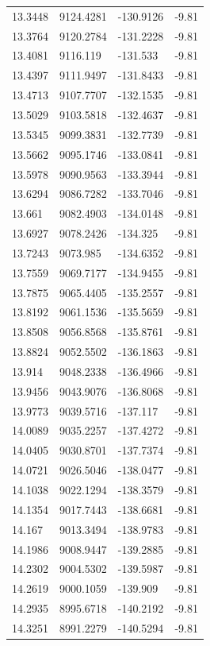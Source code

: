 \begin{table}[H]
\begin{tabular}{llll}
13.3448 & 9124.4281 & -130.9126 & -9.81 \\
13.3764 & 9120.2784 & -131.2228 & -9.81 \\
13.4081 & 9116.119 & -131.533 & -9.81 \\
13.4397 & 9111.9497 & -131.8433 & -9.81 \\
13.4713 & 9107.7707 & -132.1535 & -9.81 \\
13.5029 & 9103.5818 & -132.4637 & -9.81 \\
13.5345 & 9099.3831 & -132.7739 & -9.81 \\
13.5662 & 9095.1746 & -133.0841 & -9.81 \\
13.5978 & 9090.9563 & -133.3944 & -9.81 \\
13.6294 & 9086.7282 & -133.7046 & -9.81 \\
13.661 & 9082.4903 & -134.0148 & -9.81 \\
13.6927 & 9078.2426 & -134.325 & -9.81 \\
13.7243 & 9073.985 & -134.6352 & -9.81 \\
13.7559 & 9069.7177 & -134.9455 & -9.81 \\
13.7875 & 9065.4405 & -135.2557 & -9.81 \\
13.8192 & 9061.1536 & -135.5659 & -9.81 \\
13.8508 & 9056.8568 & -135.8761 & -9.81 \\
13.8824 & 9052.5502 & -136.1863 & -9.81 \\
13.914 & 9048.2338 & -136.4966 & -9.81 \\
13.9456 & 9043.9076 & -136.8068 & -9.81 \\
13.9773 & 9039.5716 & -137.117 & -9.81 \\
14.0089 & 9035.2257 & -137.4272 & -9.81 \\
14.0405 & 9030.8701 & -137.7374 & -9.81 \\
14.0721 & 9026.5046 & -138.0477 & -9.81 \\
14.1038 & 9022.1294 & -138.3579 & -9.81 \\
14.1354 & 9017.7443 & -138.6681 & -9.81 \\
14.167 & 9013.3494 & -138.9783 & -9.81 \\
14.1986 & 9008.9447 & -139.2885 & -9.81 \\
14.2302 & 9004.5302 & -139.5987 & -9.81 \\
14.2619 & 9000.1059 & -139.909 & -9.81 \\
14.2935 & 8995.6718 & -140.2192 & -9.81 \\
14.3251 & 8991.2279 & -140.5294 & -9.81 \\

\end{tabular}
\end{table}
